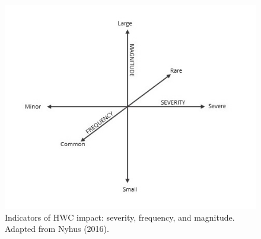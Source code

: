 \documentclass[fleqn,10pt]{olplainarticle}
\begin{document}
\begin{figure}[!ht]
    \centering
    \includegraphics[width = 1\textwidth]{axes.jpg}
    \caption{Indicators of HWC impact: severity, frequency, and magnitude. Adapted from Nyhus (2016).}
    \label{fig:indicators}
\end{figure}
\end{document}
